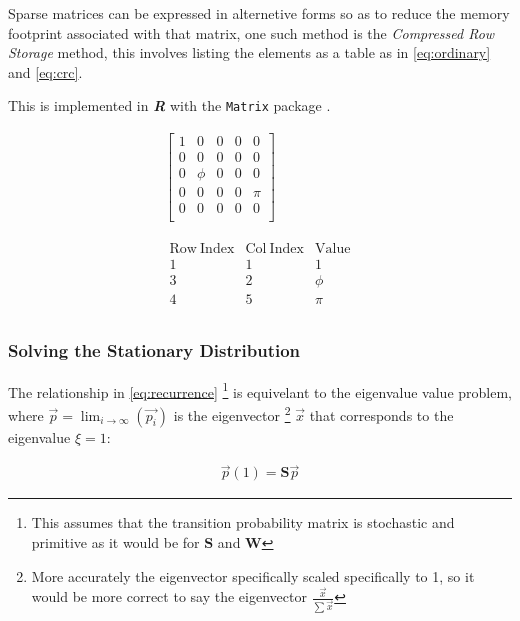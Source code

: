 \documentclass[11pt]{article}
\begin{document}
Sparse matrices can be expressed in alternetive forms so as to reduce the memory
footprint associated with that matrix, one such method is the \emph{Compressed Row Storage} method, this involves listing the elements as a table as in \eqref{eq:ordinary} and \eqref{eq:crc}.

This is implemented in \textbf{\emph{R}} with the \texttt{Matrix} package
\cite{batesMatrixSparseDense2019a} .

\begin{align}
    \begin{bmatrix}
	1 & 0 & 0 & 0 & 0 \\
	0 & 0 & 0 & 0 & 0 \\
	0 & \phi & 0 & 0 & 0 \\
	0 & 0 & 0 & 0 & \pi \\
	0 & 0 & 0 & 0 & 0 \\
    \end{bmatrix}  \label{eq:ordinary} \\
    \ \nonumber \\
    \ \nonumber \\
    \begin{matrix}
	\mathrm{Row\ Index} & \mathrm{Col\ Index} & \mathrm{Value}\\
	1 & 1 & 1 \\
	3 & 2 & \phi \\
	4 & 5 & \pi \\
    \end{matrix}  \label{eq:crc}
\end{align}


\subsubsection{Solving the Stationary Distribution}
\label{solving-stationary-dist}
The relationship in \eqref{eq:recurrence} \footnote{This assumes that the transition
probability matrix is stochastic and primitive as it would be for \(\mathbf{S}\)
and \(\mathbf{W}\)} is equivelant to the eigenvalue value problem, where
\(\vec{p} = \lim_{i \rightarrow \infty} \left( \vec{p_{i}}\right)\) is the
eigenvector \footnote{More accurately the eigenvector specifically scaled
specifically to 1, so it would be more correct to say the eigenvector
\(\frac{\vec{x}}{\sum \vec{x}}\)} \(\vec{x}\) that corresponds to the
eigenvalue \(\xi=1\):

\begin{align}
\vec{p} (1) = \mathbf{S} \vec{p} \label{eq:eigenprob}
\end{align}
\end{document}
